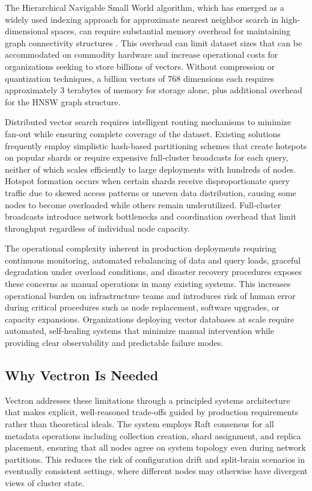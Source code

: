 \documentclass[conference]{IEEEtran}
\begin{document}
The Hierarchical Navigable Small World algorithm, which has emerged as a widely used indexing approach for approximate nearest neighbor search in high-dimensional spaces, can require substantial memory overhead for maintaining graph connectivity structures \cite{hnsw}. This overhead can limit dataset sizes that can be accommodated on commodity hardware and increase operational costs for organizations seeking to store billions of vectors. Without compression or quantization techniques, a billion vectors of 768 dimensions each requires approximately 3 terabytes of memory for storage alone, plus additional overhead for the HNSW graph structure.

Distributed vector search requires intelligent routing mechanisms to minimize fan-out while ensuring complete coverage of the dataset. Existing solutions frequently employ simplistic hash-based partitioning schemes that create hotspots on popular shards or require expensive full-cluster broadcasts for each query, neither of which scales efficiently to large deployments with hundreds of nodes. Hotspot formation occurs when certain shards receive disproportionate query traffic due to skewed access patterns or uneven data distribution, causing some nodes to become overloaded while others remain underutilized. Full-cluster broadcasts introduce network bottlenecks and coordination overhead that limit throughput regardless of individual node capacity.

The operational complexity inherent in production deployments requiring continuous monitoring, automated rebalancing of data and query loads, graceful degradation under overload conditions, and disaster recovery procedures exposes these concerns as manual operations in many existing systems. This increases operational burden on infrastructure teams and introduces risk of human error during critical procedures such as node replacement, software upgrades, or capacity expansions. Organizations deploying vector databases at scale require automated, self-healing systems that minimize manual intervention while providing clear observability and predictable failure modes.

\subsection{Why Vectron Is Needed}

Vectron addresses these limitations through a principled systems architecture that makes explicit, well-reasoned trade-offs guided by production requirements rather than theoretical ideals. The system employs Raft consensus for all metadata operations including collection creation, shard assignment, and replica placement, ensuring that all nodes agree on system topology even during network partitions. This reduces the risk of configuration drift and split-brain scenarios in eventually consistent settings, where different nodes may otherwise have divergent views of cluster state.
\end{document}
